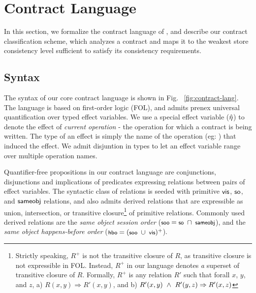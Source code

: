 \section{Contract Language}
\label{sec:contract-lang}



In this section, we formalize the contract language of \name, and describe our
contract classification scheme, which analyzes a contract and maps it to the
weakest store consistency level sufficient to satisfy its consistency
requirements.


\subsection{Syntax}

The syntax of our core contract language is shown in Fig.
~\ref{fig:contract-lang}. The language is based on first-order logic
(FOL), and admits prenex universal quantification over typed effect
variables. We use a special effect variable ($\hat{\eta}$) to denote the
effect of \emph{current operation} - the operation for which a
contract is being written. The type of an effect is simply the name of
the operation (eg: ) that induced the effect. We admit
disjuntion in types to let an effect variable range over multiple
operation names.

Quantifier-free propositions in our contract language are
conjunctions, disjunctions and implications of predicates expressing
relations between pairs of effect variables. The syntactic class of
relations is seeded with primitive ${\normalfont \textsf{vis}}$, ${\normalfont \textsf{so}}$, and ${\normalfont \textsf{sameobj}}$
relations, and also admits derived relations that are expressible as
union, intersection, or transitive closure\footnote{Strictly speaking,
$R^{+}$ is not the transitive closure of $R$, as transitive closure is
not expressible in FOL.  Instead, $R^{+}$ in our language denotes
\emph{a} superset of transitive closure of $R$. Formally, $R^{+}$ is
any relation $R'$ such that forall $x$, $y$, and $z$, a) $R(x,y)
\Rightarrow R'(x,y)$, and b) $R'(x,y) ~\wedge~ R'(y,z) \Rightarrow
R'(x,z)$} of primitive relations.  Commonly used derived relations are
the \emph{same object session order} ($\small \sooZ = \soZ ~\cap~
\sameobjZ$), 
and the \emph{same object happens-before order} ($\small \hboZ = (\sooZ
~\cup~ \visZ)^+$).


